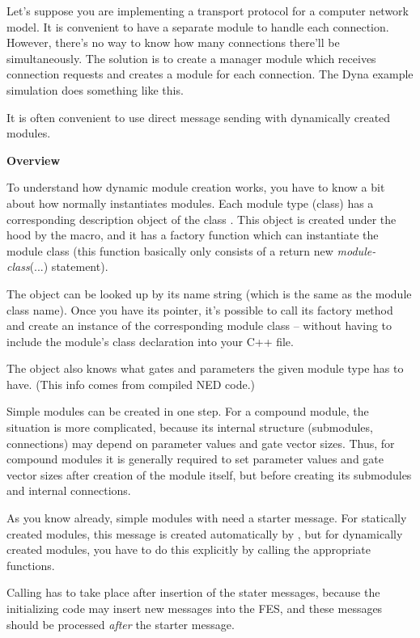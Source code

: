 Let's suppose you are implementing a transport protocol for a
computer network model. It is convenient to have a separate module
to handle each connection. However, there's no way to know how
many connections there'll be simultaneously. The solution is
to create a manager module which receives connection requests
and creates a module for each connection. The Dyna example simulation
does something like this.

It is often convenient to use direct message sending with dynamically
created modules.


\textbf{Overview }


To understand how dynamic module creation works, you have to know a
bit about how normally {\opp} instantiates modules. Each module type
(class) has a corresponding description object of the class
. This object is created under the hood by the
 macro, and it has a factory
function which can instantiate the module
class (this function basically only consists of a return new
\textit{module-class}(...)  statement).

The  object can be looked up by its name
string (which is the same as the module class name). Once you have its
pointer, it's possible to call its factory method and create an
instance of the corresponding module class -- without having to
include the module's class declaration into your C++ file.


The  object also knows what gates and
parameters the given module type has to have. (This info comes from
compiled NED code.)


Simple modules can be created in one step. For a compound module, the
situation is more complicated, because its internal structure
(submodules, connections) may depend on parameter values and gate
vector sizes. Thus, for compound modules it is generally required to
set parameter values and gate vector sizes after creation of the
module itself, but before creating its submodules and internal
connections.


As you know already, simple modules with  need a
starter message. For statically created
modules, this message is created automatically by {\opp}, but for
dynamically created modules, you have to do this explicitly by calling
the appropriate functions.


Calling  has to take place after insertion of the
stater messages, because the initializing code may insert new messages
into the FES, and these messages should be processed
\textit{after} the starter message.

